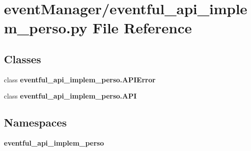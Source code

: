 \section{event\+Manager/eventful\+\_\+api\+\_\+implem\+\_\+perso.py File Reference}
\label{eventful__api__implem__perso_8py}
\subsection*{Classes}
\begin{DoxyCompactItemize}
\item 
class {\bf eventful\+\_\+api\+\_\+implem\+\_\+perso.\+A\+P\+I\+Error}
\item 
class {\bf eventful\+\_\+api\+\_\+implem\+\_\+perso.\+A\+PI}
\end{DoxyCompactItemize}
\subsection*{Namespaces}
\begin{DoxyCompactItemize}
\item 
 {\bf eventful\+\_\+api\+\_\+implem\+\_\+perso}
\end{DoxyCompactItemize}
